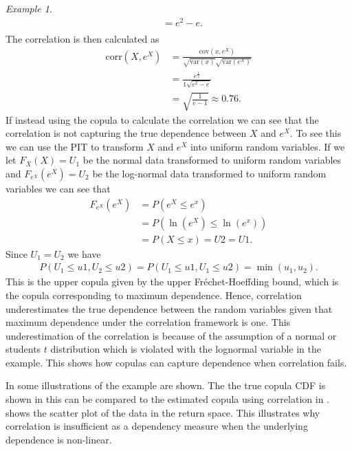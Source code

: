 \documentclass[%
a4paper,							
11pt,								
bibliography=totoc,						
abstracton=true					
]
{scrartcl}
\theoremstyle{plain}
\theoremstyle{definition}
\theoremstyle{remark}
\newtheorem{example}[theorem]{Example}
\newcommand{\1}{\mathbbm{1}}
\begin{document}
\begin{example}
\begin{align*}
        &= e^2 - e.\\
    \end{align*}
    The correlation is then calculated as
    \begin{align*}
        \mathrm{corr}(X,e^X) &= \frac{\mathrm{cov}(x,e^X)}{\sqrt{\mathrm{var}(x)} \sqrt{\mathrm{var}(e^X)}}\\
        & = \frac{e^{\frac{1}{2}}}{1\sqrt{e^2-e}}\\
        &=\sqrt{\frac{1}{e-1}} \approx 0.76. 
    \end{align*}
    If instead using the copula to calculate the correlation we can see that the correlation is not capturing the true dependence between $X$ and $e^X$. To see this we can use the \gls{PIT} to transform $X$ and $e^X$ into uniform random variables. If we let $F_X(X)=U_1$ be the normal data transformed to uniform random variables and $F_{e^X}(e^X)=U_2$ be the log-normal data transformed to uniform random variables we can see that 
    \begin{align*}
        F_{e^X}(e^X) &= P(e^X \leq e^x)\\
        &= P(\ln(e^X) \leq \ln (e^x))\\
        &=P(X\leq x) = U2 = U1.
    \end{align*}
    Since $U_1 = U_2$ we have 
    \begin{align*}
        P(U_1\leq u1, U_2\leq u2) = P(U_1\leq u1, U_1\leq u2) = \min(u_1,u_2).
    \end{align*}
    This is the upper copula given by the upper Fréchet-Hoeffding bound, which is the copula corresponding to maximum dependence. Hence, correlation underestimates the true dependence between the random variables given that maximum dependence under the correlation framework is one. This underestimation of the correlation is because of the assumption of a normal or students $t$ distribution which is violated with the lognormal variable in the example. This shows how copulas can capture dependence when correlation fails. 

    In  some illustrations of the example are shown. The the true copula \gls{CDF} is shown in  this can be compared to the estimated copula using correlation in . %
     shows the scatter plot of the data in the return space. This illustrates why correlation is insufficient as a dependency measure when the underlying dependence is non-linear. 
    

\end{example}
\end{document}
